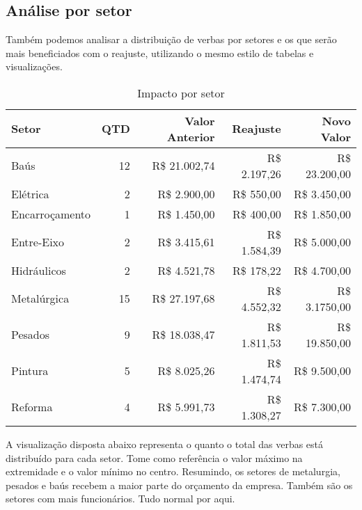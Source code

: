 \documentclass[a4paper, 12pt]{CSSullivanBusinessReport}
\begin{document}
\begin{fullwidth}
\subsection{Análise por setor}

Também podemos analisar a distribuição de verbas por setores e os que serão mais beneficiados com o reajuste, utilizando o mesmo estilo de tabelas e visualizações.


\begin{table}[h]
\centering
\caption{Impacto por setor}
\begin{tabular}{lrrrr}
    \toprule
\textbf{Setor} & \textbf{QTD} & \textbf{Valor Anterior} & \textbf{Reajuste} & \textbf{Novo Valor} \\ 
    \midrule
  Baús & 12 & R\$ 21.002,74 & R\$ 2.197,26 & R\$ 23.200,00 \\ 
  Elétrica & 2 & R\$ 2.900,00 & R\$ 550,00 & R\$ 3.450,00 \\ 
  Encarroçamento & 1 & R\$ 1.450,00 & R\$ 400,00 & R\$ 1.850,00 \\ 
  Entre-Eixo & 2 & R\$ 3.415,61 & R\$ 1.584,39 & R\$ 5.000,00 \\ 
  Hidráulicos & 2 & R\$ 4.521,78 & R\$ 178,22 & R\$ 4.700,00 \\ 
  Metalúrgica & 15 & R\$ 27.197,68 & R\$ 4.552,32 & R\$ 3.1750,00 \\ 
  Pesados & 9 & R\$ 18.038,47 & R\$ 1.811,53 & R\$ 19.850,00 \\ 
  Pintura & 5 & R\$ 8.025,26 & R\$ 1.474,74 & R\$ 9.500,00 \\ 
  Reforma & 4 & R\$ 5.991,73 & R\$ 1.308,27 & R\$ 7.300,00 \\ 
   \hline
\end{tabular}
\label{tab:setor}
\end{table}


A visualização disposta abaixo representa o quanto o total das verbas está distribuído para cada setor. Tome como referência o valor máximo na extremidade e o valor mínimo no centro. Resumindo, os setores de metalurgia, pesados e baús recebem a maior parte do orçamento da empresa. Também são os setores com mais funcionários. Tudo normal por aqui.


\end{fullwidth}
\end{document}
